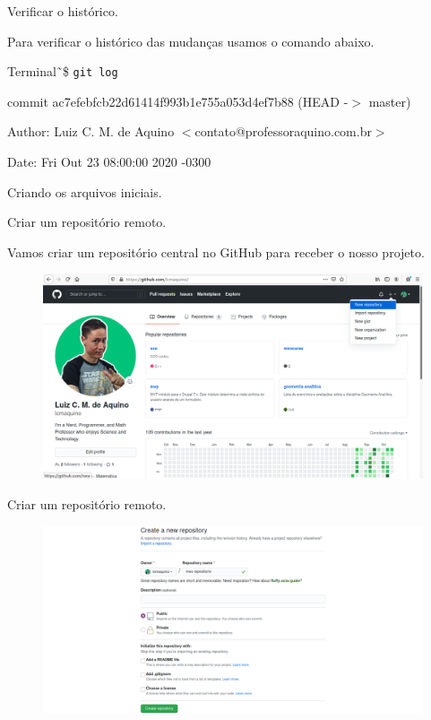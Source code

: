 \documentclass[brazil,aspectratio=169]{beamer}
\newcommand{\terminal}[1]{\textcolor{my-green}{\texttt{#1}}}
\begin{document}
\begin{frame}{Verificar o histórico.}

  Para verificar o histórico das mudanças usamos o comando abaixo.

  \begin{exampleblock}{Terminal}
    \~\,\$ \terminal{git log}

    commit ac7efebfcb22d61414f993b1e755a053d4ef7b88 (HEAD -$>$ master)

    Author: Luiz C. M. de Aquino $<$contato@professoraquino.com.br$>$

    Date: Fri Out 23 08:00:00 2020 -0300

    Criando os arquivos iniciais.
  \end{exampleblock}
  
\end{frame}

\begin{frame}{Criar um repositório remoto.}

  Vamos criar um repositório central no GitHub para receber o nosso projeto.

  \begin{figure}
    \centering
    \includegraphics[scale=0.3]{imagens/novo-repositorio-github-1}
  \end{figure}
  
\end{frame}

\begin{frame}{Criar um repositório remoto.}

  \begin{figure}
    \centering
    \includegraphics[scale=0.3]{imagens/novo-repositorio-github-2}
  \end{figure}
  
\end{frame}
\end{document}
